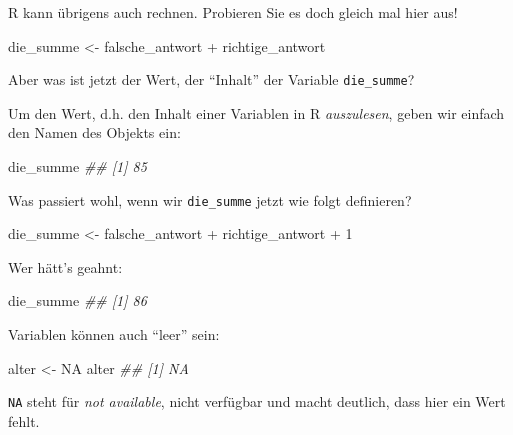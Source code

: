 \documentclass[
  a4paper,
]{scrbook}
\newenvironment{Shaded}{\begin{snugshade}}{\end{snugshade}}
\newcommand{\ConstantTok}[1]{\textcolor[rgb]{0.56,0.35,0.01}{#1}}
\newcommand{\DecValTok}[1]{\textcolor[rgb]{0.68,0.00,0.00}{#1}}
\newcommand{\DocumentationTok}[1]{\textcolor[rgb]{0.37,0.37,0.37}{\textit{#1}}}
\newcommand{\NormalTok}[1]{\textcolor[rgb]{0.00,0.23,0.31}{#1}}
\newcommand{\OtherTok}[1]{\textcolor[rgb]{0.00,0.23,0.31}{#1}}
\newcommand{\SpecialCharTok}[1]{\textcolor[rgb]{0.37,0.37,0.37}{#1}}
\theoremstyle{definition}
\theoremstyle{definition}
\theoremstyle{definition}
\theoremstyle{remark}
\begin{document}
R kann übrigens auch rechnen. Probieren Sie es doch gleich mal hier aus!

\begin{Shaded}
\begin{Highlighting}[]
\NormalTok{die\_summe }\OtherTok{\textless{}{-}}\NormalTok{ falsche\_antwort }\SpecialCharTok{+}\NormalTok{ richtige\_antwort}
\end{Highlighting}
\end{Shaded}

Aber was ist jetzt der Wert, der ``Inhalt'' der Variable
\texttt{die\_summe}?

Um den Wert, d.h. den Inhalt einer Variablen in R \emph{auszulesen},
geben wir einfach den Namen des Objekts ein:

\begin{Shaded}
\begin{Highlighting}[]
\NormalTok{die\_summe}
\DocumentationTok{\#\# [1] 85}
\end{Highlighting}
\end{Shaded}

Was passiert wohl, wenn wir \texttt{die\_summe} jetzt wie folgt
definieren?

\begin{Shaded}
\begin{Highlighting}[]
\NormalTok{die\_summe }\OtherTok{\textless{}{-}}\NormalTok{ falsche\_antwort }\SpecialCharTok{+}\NormalTok{ richtige\_antwort }\SpecialCharTok{+} \DecValTok{1}
\end{Highlighting}
\end{Shaded}

Wer hätt's geahnt:

\begin{Shaded}
\begin{Highlighting}[]
\NormalTok{die\_summe}
\DocumentationTok{\#\# [1] 86}
\end{Highlighting}
\end{Shaded}

Variablen können auch ``leer'' sein:

\begin{Shaded}
\begin{Highlighting}[]
\NormalTok{alter }\OtherTok{\textless{}{-}} \ConstantTok{NA}
\NormalTok{alter}
\DocumentationTok{\#\# [1] NA}
\end{Highlighting}
\end{Shaded}

\texttt{NA} steht für \emph{not available}, nicht verfügbar und macht
deutlich, dass hier ein Wert fehlt.
\end{document}
